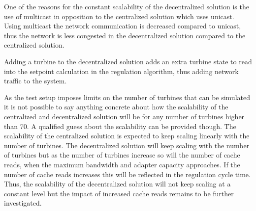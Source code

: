 One of the reasons for the constant scalability of the decentralized solution is the use of multicast in opposition to the centralized solution which uses unicast.
Using multicast the network communication is decreased compared to unicast, thus the network is less congested in the decentralized solution compared to the centralized solution.

Adding a turbine to the decentralized solution adds an extra turbine state to read into the setpoint calculation in the regulation algorithm, thus adding network traffic to the system.

As the test setup imposes limits on the number of turbines that can be simulated it is not possible to say anything concrete about how the scalability of the centralized and decentralized solution will be for any number of turbines higher than 70.
A qualified guess about the scalability can be provided though. The scalability of the centralized solution is expected to keep scaling linearly with the number of turbines. The decentralized solution will keep scaling with the number of turbines but as the number of turbines increase so will the number of cache reads, when the maximum bandwidth and adapter capacity approaches. If the number of cache reads increases this will be reflected in the regulation cycle time. Thus, the scalability of the decentralized solution will not keep scaling at a constant level but the impact of increased cache reads remains to be further investigated.


\FloatBarrier


